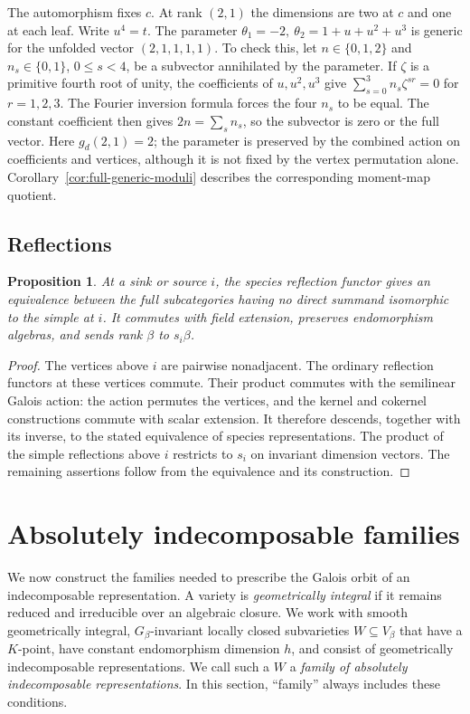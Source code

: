 \documentclass[11pt, reqno]{amsart}
\numberwithin{equation}{section}
\newtheorem{proposition}[theorem]{Proposition}
\theoremstyle{definition}
\theoremstyle{remark}
\begin{document}
The automorphism fixes $c$. At rank $(2,1)$ the dimensions are two
at $c$ and one at each leaf. Write $u^4=t$. The parameter
$\theta_1=-2,\ \theta_2=1+u+u^2+u^3$
is generic for the unfolded vector $(2,1,1,1,1)$. To check this,
let $n\in\{0,1,2\}$ and $n_s\in\{0,1\}$, $0\le s<4$, be a
subvector annihilated by the parameter. If $\zeta$ is a primitive
fourth root of unity, the coefficients of $u,u^2,u^3$ give
$\sum_{s=0}^3 n_s\zeta^{sr}=0$ for $r=1,2,3$.
The Fourier inversion formula forces the four $n_s$ to be equal.
The constant coefficient then gives $2n=\sum_s n_s$, so the
subvector is zero or the full vector. Here $g_d(2,1)=2$; the
parameter is preserved by the combined action on coefficients and
vertices, although it is not fixed by the vertex permutation alone.
Corollary~\ref{cor:full-generic-moduli} describes the corresponding
moment-map quotient.

\subsection{Reflections}

\begin{proposition}\label{prop:reflections}
At a sink or source $i$, the species reflection functor gives an
equivalence between the full subcategories having no direct summand
isomorphic to the simple at $i$. It commutes with field extension,
preserves endomorphism algebras, and sends rank $\beta$ to $s_i\beta$.
\end{proposition}
\begin{proof}
The vertices above $i$ are pairwise nonadjacent. The ordinary
reflection functors at these vertices commute. Their product
commutes with the semilinear Galois action: the action permutes
the vertices, and the kernel and cokernel constructions commute
with scalar extension. It therefore descends, together with its
inverse, to the stated equivalence of species representations.
The product of the simple reflections above $i$ restricts to $s_i$
on invariant dimension vectors. The remaining assertions follow
from the equivalence and its construction.
\end{proof}

\section{Absolutely indecomposable families}\label{sec:imaginary}
\label{sec:absolute-families}
We now construct the families needed to prescribe the Galois orbit
of an indecomposable representation. A variety is \emph{geometrically
integral} if it remains reduced and irreducible over an algebraic
closure. We work with smooth geometrically integral,
$G_\beta$-invariant locally closed subvarieties
$W\subseteq V_\beta$ that have a $K$-point, have constant endomorphism
dimension $h$, and consist of geometrically indecomposable
representations. We call such a $W$ a \emph{family of absolutely
indecomposable representations}. In this section, ``family'' always
includes these conditions.
\end{document}
